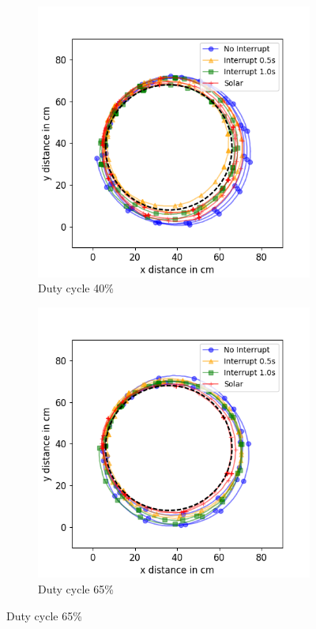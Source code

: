 \begin{figure}[h!]
	\centering
	\begin{subfigure}[b]{0.49\textwidth}
		\includegraphics[width=\textwidth]{pics/circle_40.png}
		\caption{Duty cycle 40\%}
		\label{fig:circ_exp1}
	\end{subfigure}
	\begin{subfigure}[b]{0.49\textwidth}
		\includegraphics[width=\textwidth]{pics/circle_65.png}
		\caption{Duty cycle 65\%}
		\label{fig:circ_exp2}
	\end{subfigure}


\end{figure}
